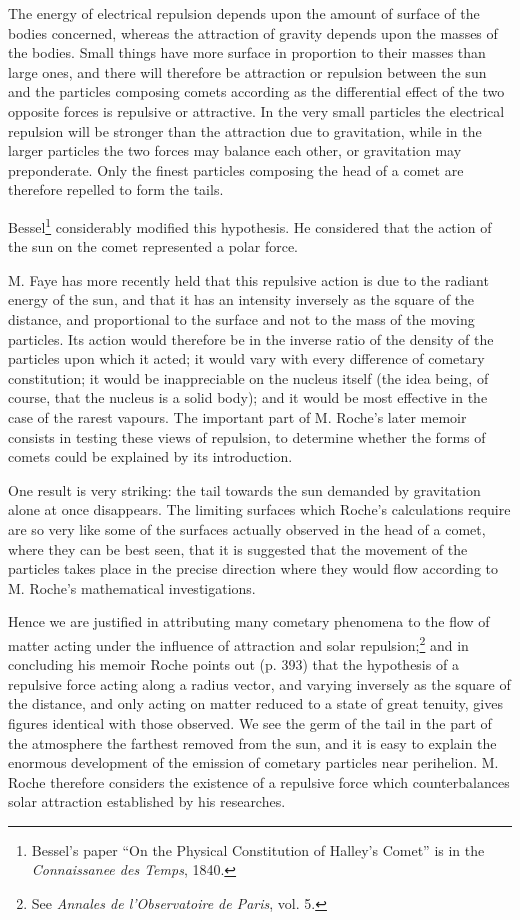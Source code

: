 \documentclass[a4paper, 12pt, oneside, polutonikogreek, english]{article}
\begin{document}
The energy of electrical repulsion depends upon the amount of surface of the bodies concerned, whereas the attraction of gravity depends upon the masses of the bodies. Small things have more surface in proportion to their masses than large ones, and there will therefore be attraction or repulsion between the sun and the particles composing comets according as the differential effect of the two opposite forces is repulsive or attractive. In the very small particles the electrical repulsion will be stronger than the attraction due to gravitation, while in the larger particles the two forces may balance each other, or gravitation may preponderate. Only the finest particles composing the head of a comet are therefore repelled to form the tails.

Bessel\footnote{Bessel's paper ``On the Physical Constitution of Halley's Comet'' is in the \emph{Connaissanee des Temps}, 1840.} considerably modified this hypothesis. He considered that the action of the sun on the comet represented a polar force.

M. Faye has more recently held that this repulsive action is due to the radiant energy of the sun, and that it has an intensity inversely as the square of the distance, and proportional to the surface and not to the mass of the moving particles. Its action would therefore be in the inverse ratio of the density of the particles upon which it acted; it would vary with every difference of cometary constitution; it would be inappreciable on the nucleus itself (the idea being, of course, that the nucleus is a solid body); and it would be most effective in the case of the rarest vapours. The important part of M. Roche's later memoir consists in testing these views of repulsion, to determine whether the forms of comets could be explained by its introduction.

One result is very striking: the tail towards the sun demanded by gravitation alone at once disappears. The limiting surfaces which Roche's calculations require are so very like some of the surfaces actually observed in the head of a comet, where they can be best seen, that it is suggested that the movement of the particles takes place in the precise direction where they would flow according to M. Roche's mathematical investigations.

Hence we are justified in attributing many cometary phenomena to the flow of matter acting under the influence of attraction and solar repulsion;\footnote{See \emph{Annales de l'Observatoire de Paris}, vol. 5.} and in concluding his memoir Roche points out (p. 393) that the hypothesis of a repulsive force acting along a radius vector, and varying inversely as the square of the distance, and only acting on matter reduced to a state of great tenuity, gives figures identical with those observed. We see the germ of the tail in the part of the atmosphere the farthest removed from the sun, and it is easy to explain the enormous development of the emission of cometary particles near perihelion. M. Roche therefore considers the existence of a repulsive force which counterbalances solar attraction established by his researches.
\end{document}
